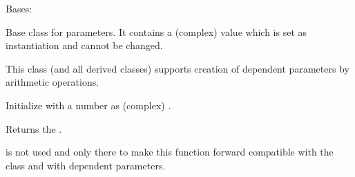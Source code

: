 \documentclass[letterpaper,10pt,english]{sphinxmanual}
\begin{document}
\begin{fulllineitems}
\label{\detokenize{modules-api/parameters:Parameters.Parameter}}
Bases: 

Base class for parameters. It contains a (complex) value which is set as instantiation and cannot be changed.

This class (and all derived classes) supports creation of dependent parameters by arithmetic operations.

\begin{fulllineitems}
\label{\detokenize{modules-api/parameters:Parameters.Parameter.__init__}}
Initialize with a number as (complex) .

\end{fulllineitems}


\begin{fulllineitems}
\label{\detokenize{modules-api/parameters:Parameters.Parameter.getValue}}
Returns the .

 is not used and only there to make this function forward compatible with the {\hyperref[\detokenize{modules-api/parameters:Parameters.Fitparameter}]{}} class and with dependent parameters.

\end{fulllineitems}


\end{fulllineitems}

\end{document}
